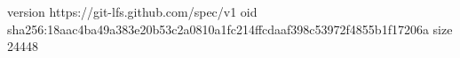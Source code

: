 version https://git-lfs.github.com/spec/v1
oid sha256:18aac4ba49a383e20b53c2a0810a1fc214ffcdaaf398c53972f4855b1f17206a
size 24448
